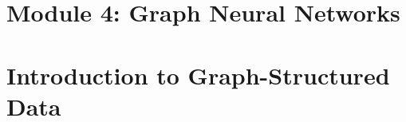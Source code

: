 \documentclass[12pt,a4paper]{article}
\begin{document}
\section*{Module 4: Graph Neural Networks}




\section{Introduction to Graph-Structured Data}
\end{document}
